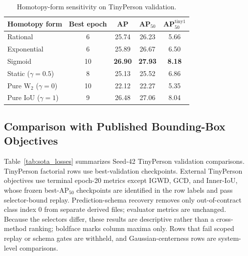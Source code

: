 \documentclass[11pt,a4paper]{article}
\providecommand{\toprule}{\hline}
\providecommand{\midrule}{\hline}
\providecommand{\bottomrule}{\hline}
\begin{document}
\begin{table}[t]
  \centering
  \caption{Homotopy-form sensitivity on TinyPerson validation.}
  \label{tab:homotopy_form_sensitivity}
  \small
  \begin{tabular}{lcccc}
    \toprule
    Homotopy form & Best epoch & AP & AP$_{50}$ & AP$_{50}^{\mathrm{tiny1}}$ \\
    \midrule
    Rational & 6 & 25.74 & 26.23 & 5.66 \\
    Exponential & 6 & 25.89 & 26.67 & 6.50 \\
    Sigmoid & 10 & \textbf{26.90} & \textbf{27.93} & \textbf{8.18} \\
    Static ($\gamma=0.5$) & 8 & 25.13 & 25.52 & 6.86 \\
    Pure W$_2$ ($\gamma=0$) & 10 & 22.12 & 22.27 & 5.35 \\
    Pure IoU ($\gamma=1$) & 9 & 26.48 & 27.06 & 8.04 \\
    \bottomrule
  \end{tabular}
\end{table}

\subsection{Comparison with Published Bounding-Box Objectives}
\label{sec:sota_loss_benchmark}

Table~\ref{tab:sota_losses} summarizes Seed-42 TinyPerson validation comparisons. TinyPerson factorial rows use best-validation checkpoints. External TinyPerson objectives use terminal epoch-20 metrics except IGWD, GCD, and Inner-IoU, whose frozen best-AP$_{50}$ checkpoints are identified in the row labels and pass selector-bound replay. Prediction-schema recovery removes only out-of-contract class index 0 from separate derived files; evaluator metrics are unchanged. Because the selectors differ, these results are descriptive rather than a cross-method ranking; boldface marks column maxima only. Rows that fail scoped replay or schema gates are withheld, and Gaussian-centerness rows are system-level comparisons.
\end{document}
